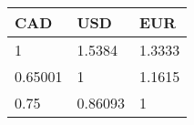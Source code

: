 \begin{tabular}{lll}
CAD & USD & EUR \\ 
\hline 
1 & 1.5384 & 1.3333 \\ 
0.65001 & 1 & 1.1615 \\ 
0.75 & 0.86093 & 1 \\ 
\hline 
\end{tabular}